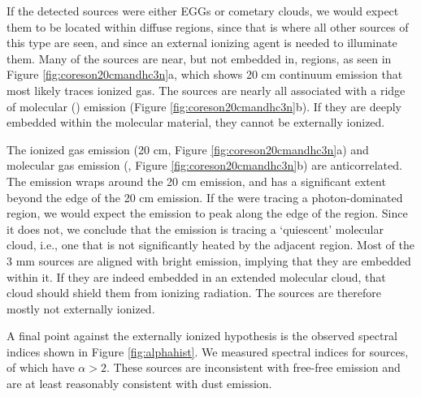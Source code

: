 \documentclass[twocolumn]{aastex61}
\begin{document}
If the detected sources were either EGGs or cometary clouds, we would expect
them to be located within diffuse \hii regions, since that is where all other
sources of this type are seen, and since an external ionizing agent is needed
to illuminate them.  Many of the sources are near, but not embedded in, \hii
regions, as seen in Figure \ref{fig:coreson20cmandhc3n}a, which shows 20 cm
continuum emission that most likely traces ionized gas.  The sources are
nearly all associated with a ridge of molecular (\cyanoacetylene) emission
(Figure
\ref{fig:coreson20cmandhc3n}b).  If they are deeply embedded within the
molecular material, they cannot be externally ionized.  

The ionized gas emission (20 cm, Figure \ref{fig:coreson20cmandhc3n}a) and
molecular gas emission (\cyanoacetylene, Figure \ref{fig:coreson20cmandhc3n}b)
are anticorrelated.  The \cyanoacetylene emission wraps around the 20 cm
emission, and has a significant extent beyond the edge of the 20 cm emission.
If the \cyanoacetylene were tracing a photon-dominated region, we would expect
the \cyanoacetylene emission to peak along the edge of the \hii region.
Since it does not, we conclude that the \cyanoacetylene emission is tracing a
`quiescent' molecular cloud, i.e., one that is not significantly heated by
the adjacent \hii region.  Most of the 3 mm sources are aligned with bright
\cyanoacetylene emission, implying that they are embedded within it.
If they are indeed embedded in an extended molecular cloud, that cloud
should shield them from ionizing radiation.  The sources are therefore
mostly not externally ionized.

A final point against the externally ionized hypothesis is the observed
spectral indices shown in Figure \ref{fig:alphahist}.  We measured spectral
indices for \nalphas sources, of which \ngttwo have $\alpha>2$.  These \ngttwo
sources are inconsistent with free-free emission and are at least reasonably
consistent with dust emission.

\end{document}
